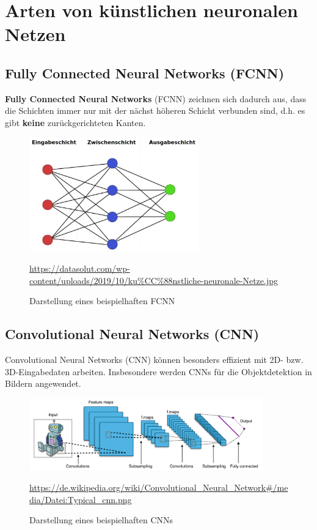 \section{Arten von  künstlichen neuronalen Netzen}

\subsection{Fully Connected Neural Networks (FCNN)}

	\textbf{Fully Connected Neural Networks} (FCNN) zeichnen sich dadurch aus, dass die Schichten immer nur mit der nächst höheren Schicht verbunden sind, d.h. es gibt \textbf{keine} zurückgerichteten Kanten. \cite{datasolut4}
	
	\begin{figure}[H]
		\centering
		\includegraphics[width=0.65\textwidth]{kapitel3/images/Simples_Neuronales_Netz.jpg}
		\caption{Darstellung eines beispielhaften FCNN}
		\vspace{0.2cm}
		\quelle\url{https://datasolut.com/wp-content/uploads/2019/10/ku%CC%88nstliche-neuronale-Netze.jpg}
	\end{figure}

\subsection{Convolutional Neural Networks (CNN)}

	Convolutional Neural Networks (CNN) können besonders effizient mit 2D- bzw. 3D-Eingabedaten arbeiten. Insbesondere werden CNNs für die Objektdetektion in Bildern angewendet. \cite{datasolut4} \\
	
	\begin{figure}[H]
		\centering
		\includegraphics[width=0.9\textwidth]{kapitel3/images/cnn.png}
		\caption{Darstellung eines beispielhaften CNNs}
		\vspace{0.2cm}
		\quelle\url{https://de.wikipedia.org/wiki/Convolutional_Neural_Network#/media/Datei:Typical_cnn.png}
	\end{figure}
	
